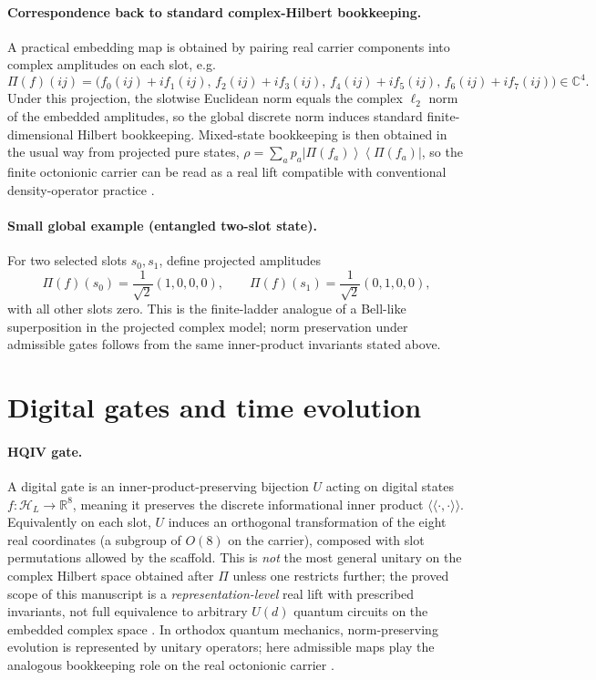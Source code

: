 \documentclass[11pt,a4paper]{article}
\theoremstyle{remark}
\begin{document}
\paragraph{Correspondence back to standard complex-Hilbert bookkeeping.}
A practical embedding map is obtained by pairing real carrier components into complex amplitudes on each slot, e.g.
\[
  \Pi(f)(ij) = \bigl(f_0(ij)+i f_1(ij),\, f_2(ij)+i f_3(ij),\, f_4(ij)+i f_5(ij),\, f_6(ij)+i f_7(ij)\bigr)\in\mathbb{C}^4.
\]
Under this projection, the slotwise Euclidean norm equals the complex $\ell_2$ norm of the embedded amplitudes, so the global discrete norm induces standard finite-dimensional Hilbert bookkeeping. Mixed-state bookkeeping is then obtained in the usual way from projected pure states, $\rho=\sum_a p_a \left|\Pi(f_a)\right\rangle\!\left\langle\Pi(f_a)\right|$, so the finite octonionic carrier can be read as a real lift compatible with conventional density-operator practice \cite{vonNeumann1955,dirac1930}.

\paragraph{Small global example (entangled two-slot state).}
For two selected slots $s_0,s_1$, define projected amplitudes
\[
  \Pi(f)(s_0)=\frac{1}{\sqrt{2}}(1,0,0,0),\qquad
  \Pi(f)(s_1)=\frac{1}{\sqrt{2}}(0,1,0,0),
\]
with all other slots zero. This is the finite-ladder analogue of a Bell-like superposition in the projected complex model; norm preservation under admissible gates follows from the same inner-product invariants stated above.

\section{Digital gates and time evolution}
\label{sec:gates}

\paragraph{HQIV gate.}
A digital gate is an inner-product-preserving bijection $U$ acting on digital states $f:\mathcal{H}_L\to\mathbb{R}^8$, meaning it preserves the discrete informational inner product $\langle\!\langle\cdot,\cdot\rangle\!\rangle$. Equivalently on each slot, $U$ induces an orthogonal transformation of the eight real coordinates (a subgroup of $O(8)$ on the carrier), composed with slot permutations allowed by the scaffold. This is \emph{not} the most general unitary on the complex Hilbert space obtained after $\Pi$ unless one restricts further; the proved scope of this manuscript is a \emph{representation-level} real lift with prescribed invariants, not full equivalence to arbitrary $U(d)$ quantum circuits on the embedded complex space \cite{vonNeumann1955,dirac1930}. In orthodox quantum mechanics, norm-preserving evolution is represented by unitary operators; here admissible maps play the analogous bookkeeping role on the real octonionic carrier \cite{freedman2019}.
\end{document}
